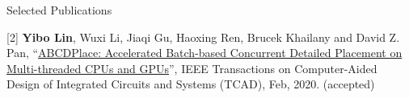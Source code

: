 \begin{rSection}{Selected Publications}
\item[{[2]}]{
        \textbf{Yibo Lin}, Wuxi Li, Jiaqi Gu, Haoxing Ren, Brucek Khailany and David Z. Pan, 
    ``\href{https://doi.org/10.1109/TCAD.2020.2971531}{ABCDPlace: Accelerated Batch-based Concurrent Detailed Placement on Multi-threaded CPUs and GPUs}'', 
    IEEE Transactions on Computer-Aided Design of Integrated Circuits and Systems (TCAD), Feb, 2020.
    (accepted)
}
            

%    
%            
%
%    
%            
%
%    
%            
%
%    
%            
%
%    
%            
%

\end{rSection}
